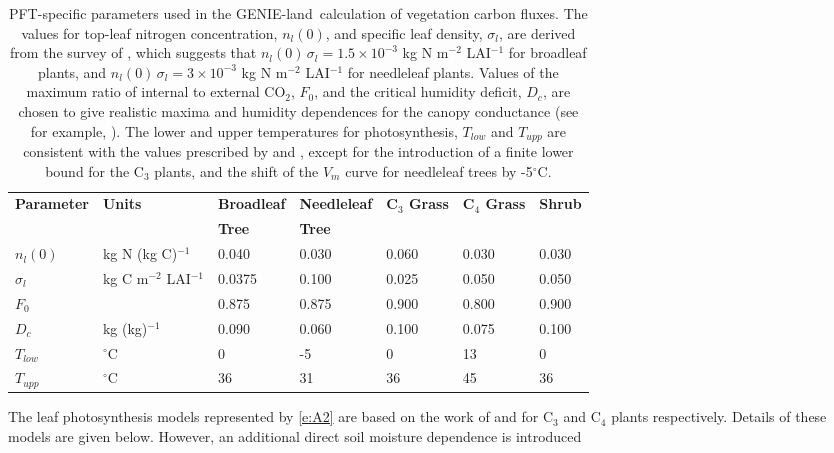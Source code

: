 \documentclass[a4paper]{article}
\newcommand{\gnl}{GENIE-land}
\begin{document}
\begin{table}
\begin{center}
\begin{tabular}{|ll|l|l|l|l|l|} \hline
{\bf Parameter}   &{\bf Units}  & {\bf Broadleaf}& {\bf Needleleaf} & {\bf C$_{3}$ Grass} & {\bf C$_{4}$ Grass} & {\bf Shrub} \\
                  &             & {\bf Tree}     & {\bf Tree}       &&&   \\ \hline
$n_{l} (0)$       & kg N (kg C)$^{-1}$ & 0.040 & 0.030 & 0.060 & 0.030 & 0.030 \\
$\sigma_{l}$      & kg C m$^{-2}$ LAI$^{-1}$     & 0.0375& 0.100 & 0.025 & 0.050 & 0.050 \\
$F_{0}$           &             & 0.875 & 0.875 & 0.900 & 0.800 & 0.900 \\
$D_{c}$           & kg (kg)$^{-1}$ & 0.090 & 0.060 & 0.100 & 0.075 & 0.100 \\
$T_{low}$         & $^{\circ}$C & 0     & -5    & 0     & 13    & 0     \\
$T_{upp}$         & $^{\circ}$C & 36    & 31    & 36    & 45    & 36    \\
\hline
\end{tabular}
\caption{PFT-specific parameters used in the \gnl\ calculation of
vegetation carbon fluxes. The values for top-leaf nitrogen
concentration, $n_{l}(0)$, and specific leaf density, $\sigma_{l}$,
are derived from the survey of \citet{Sch94}, which suggests that
$n_{l}(0) \, \sigma_{l} = 1.5 \times 10^{-3}$ kg N m$^{-2}$ LAI$^{-1}$
for broadleaf plants, and $n_{l}(0) \, \sigma_{l} = 3 \times 10^{-3}$
kg N m$^{-2}$ LAI$^{-1}$ for needleleaf plants.  Values of the maximum
ratio of internal to external CO$_{2}$, $F_{0}$, and the critical
humidity deficit, $D_{c}$, are chosen to give realistic maxima and
humidity dependences for the canopy conductance (see for example,
\citet{Cox98}).  The lower and upper temperatures for photosynthesis,
$T_{low}$ and $T_{upp}$ are consistent with the values prescribed by
\citet{Col91} and \citet{Col92}, except for the introduction of a
finite lower bound for the C$_{3}$ plants, and the shift of the
$V_{m}$ curve for needleleaf trees by -5$^{\circ}$C.}
\label{t:gc}
\end{center}
\end{table}
The leaf photosynthesis models represented by \eqref{e:A2} are based on
the work of \citet{Col91} and \citet{Col92} for C$_{3}$ and C$_{4}$
plants respectively. Details of these models are given below.
However, an additional direct soil moisture dependence is introduced
\end{document}
